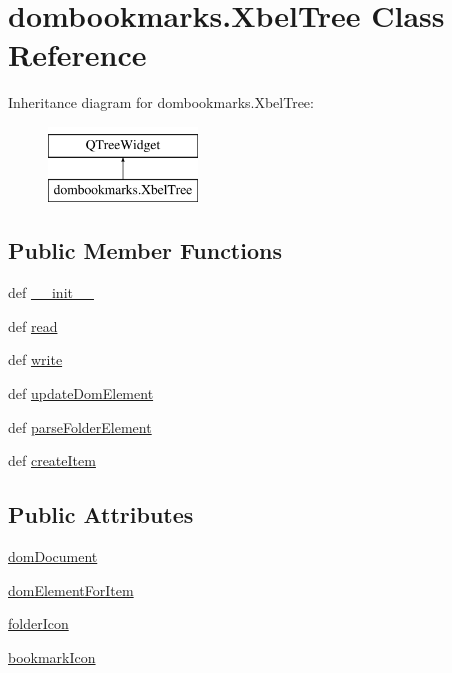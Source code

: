 \hypertarget{classdombookmarks_1_1XbelTree}{}\section{dombookmarks.\+Xbel\+Tree Class Reference}
\label{classdombookmarks_1_1XbelTree}
Inheritance diagram for dombookmarks.\+Xbel\+Tree\+:\begin{figure}[H]
\begin{center}
\leavevmode
\includegraphics[height=2.000000cm]{classdombookmarks_1_1XbelTree}
\end{center}
\end{figure}
\subsection*{Public Member Functions}
\begin{DoxyCompactItemize}
\item 
def \hyperlink{classdombookmarks_1_1XbelTree_a22bd130dfda46a4977026012e60abfdd}{\+\_\+\+\_\+init\+\_\+\+\_\+}
\item 
def \hyperlink{classdombookmarks_1_1XbelTree_acdbb308dd4e39aff7a66b6792d81fd85}{read}
\item 
def \hyperlink{classdombookmarks_1_1XbelTree_aa39c6f0566c12a69420dc4272094f506}{write}
\item 
def \hyperlink{classdombookmarks_1_1XbelTree_ae41045e703d50ca70c8458217ac2389d}{update\+Dom\+Element}
\item 
def \hyperlink{classdombookmarks_1_1XbelTree_a3d62c1f4a26547e13faa7619913e967b}{parse\+Folder\+Element}
\item 
def \hyperlink{classdombookmarks_1_1XbelTree_aeeb20f4c6b84368b281cf846a37b6dbf}{create\+Item}
\end{DoxyCompactItemize}
\subsection*{Public Attributes}
\begin{DoxyCompactItemize}
\item 
\hyperlink{classdombookmarks_1_1XbelTree_a975b2eec0c8a621888273352a0444682}{dom\+Document}
\item 
\hyperlink{classdombookmarks_1_1XbelTree_a9c95dcdd78d041b808f94c30ae4faea5}{dom\+Element\+For\+Item}
\item 
\hyperlink{classdombookmarks_1_1XbelTree_a36f38830f13ba756256049ceb5bcc53d}{folder\+Icon}
\item 
\hyperlink{classdombookmarks_1_1XbelTree_a9502651166f7bc2e528970facf47c9f3}{bookmark\+Icon}
\end{DoxyCompactItemize}



